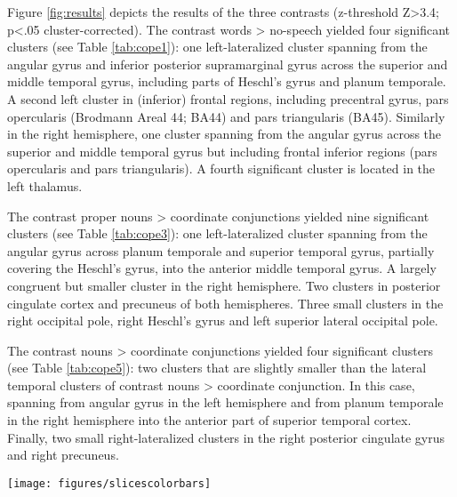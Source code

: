 \documentclass[10pt,a4paper,onecolumn]{article}
\begin{document}
Figure \ref{fig:results} depicts the results of the three contrasts (z-threshold
Z>3.4; p<.05 cluster-corrected).
The contrast words > no-speech yielded four significant clusters (see Table
\ref{tab:cope1}):
one left-lateralized cluster spanning from the angular gyrus and inferior
posterior supramarginal gyrus across the superior and middle temporal gyrus,
including parts of Heschl's gyrus and planum temporale.
A second left cluster in (inferior) frontal regions, including precentral gyrus,
pars opercularis (Brodmann Areal 44; BA44) and pars triangularis (BA45).
Similarly in the right hemisphere, one cluster spanning from the angular gyrus
across the superior and middle temporal gyrus but including frontal inferior
regions (pars opercularis and pars triangularis).
A fourth significant cluster is located in the left thalamus.

The contrast proper nouns > coordinate conjunctions yielded nine significant
clusters (see Table \ref{tab:cope3}):
one left-lateralized cluster spanning from the angular gyrus across planum
temporale and superior temporal gyrus, partially covering the Heschl's gyrus,
into the anterior middle temporal gyrus.
A largely congruent but smaller cluster in the right hemisphere.
Two clusters in posterior cingulate cortex and precuneus of both hemispheres.
Three small clusters in the right occipital pole, right Heschl's gyrus and left
superior lateral occipital pole.

The contrast nouns > coordinate conjunctions yielded four significant clusters
(see Table \ref{tab:cope5}):
two clusters that are slightly smaller than the lateral temporal clusters of
contrast nouns > coordinate conjunction.
In this case, spanning from angular gyrus in the left hemisphere and from planum
temporale in the right hemisphere into the anterior part of superior temporal
cortex.
Finally, two small right-lateralized clusters in the right posterior cingulate
gyrus and right precuneus.


\begin{figure*} \centering
    \texttt{[image: figures/slicescolorbars]}
    \caption{Results of the mixed-effects group-level (N=14) GLM $t$-contrasts
        for the audio-description of the movie ``Forrest Gump''.
        Significant clusters (Z>3.4, p<0.05 cluster-corrected) are overlaid on
        the MNI152 T1-weighted head template (grey).
        Light grey: The audio-description dataset's field-of-view
        (cf. \citep{hanke2014audiomovie}).}
    \label{fig:results}
\end{figure*}
\end{document}
